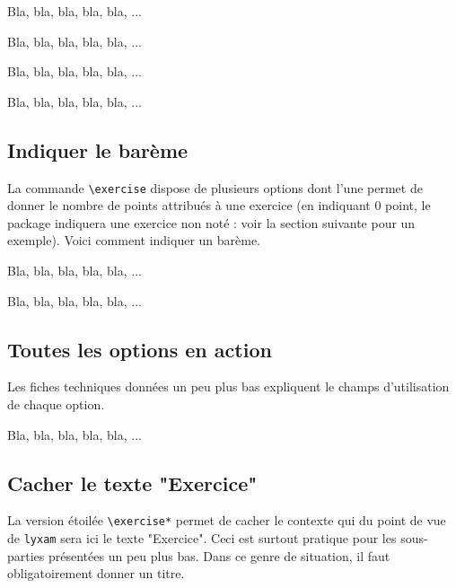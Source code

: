 \documentclass[12pt,a4paper]{article}
\makeatletter
\theoremstyle{definition}
\newcommand\resetallcnt{
		\setcounter{lyxam@counter@topic}{0}
		\setcounter{lyxam@counter@exercise}{0}
		\setcounter{lyxam@counter@problem}{0}
		\setcounter{lyxam@counter@bonus}{0}
		\setcounter{lyxam@counter@subpart}{0}
	}
\makeatother
\begin{document}
\begin{tcblisting}{}
\exercise
Bla, bla, bla, bla, bla, ...

\exercise
Bla, bla, bla, bla, bla, ...

\problem
Bla, bla, bla, bla, bla, ...

\bonus
Bla, bla, bla, bla, bla, ...
\end{tcblisting}



    \subsection{Indiquer le barème}

La commande \verb+\exercise+ dispose de plusieurs options dont l'une permet de donner le nombre de points attribués à une exercice (en indiquant $0$ point, le package indiquera une exercice non noté : voir la section suivante pour un exemple). Voici comment indiquer un barème.

\resetallcnt{}

\begin{tcblisting}{}
\exercise[pts = 5]
Bla, bla, bla, bla, bla, ...

\exercise[pts = 15]
Bla, bla, bla, bla, bla, ...
\end{tcblisting}


    \subsection{Toutes les options en action}

Les fiches techniques données un peu plus bas expliquent le champs d'utilisation de chaque option.

\begin{tcblisting}{}
\exercise[pts   = 0,
          time  = 3 jours,
          id    = facultatif,
          title = Devinette,
          note  = Pour spécialistes uniquement,
          src   = Le livre des experts]

Bla, bla, bla, bla, bla, ...
\end{tcblisting}



    \subsection{Cacher le texte "Exercice"}

La version étoilée \verb+\exercise*+ permet de cacher le contexte qui du point de vue de \verb+lyxam+ sera ici le texte "Exercice". Ceci est surtout pratique pour les sous-parties présentées un peu plus bas. Dans ce genre de situation, il faut obligatoirement donner un titre.
\end{document}
